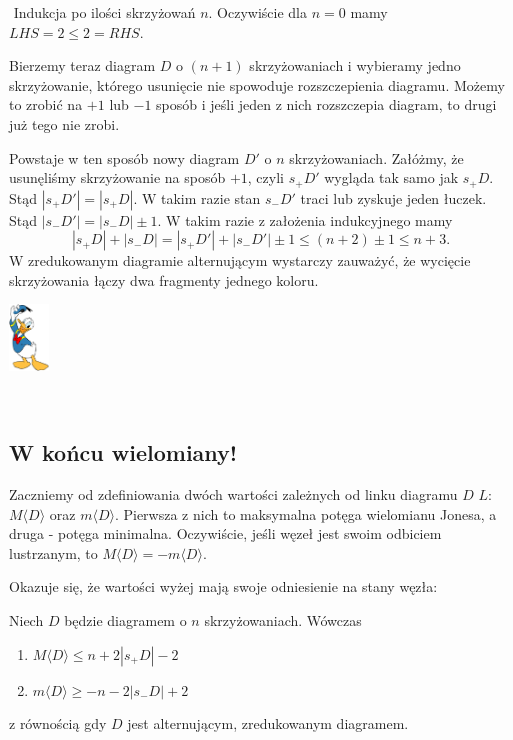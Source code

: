 \documentclass{article}
\renewenvironment{proof}{{\bfseries\color{orange} Dowód}$ $\newline}{
  \begin{flushright}\includegraphics[width=30pt]{Donald_Duck.png}\end{flushright}$ $\newline
}
\begin{document}
\begin{proof}
  Indukcja po ilości skrzyżowań $n$. Oczywiście dla $n=0$ mamy $LHS=2\leq 2=RHS$.

  Bierzemy teraz diagram $D$ o $(n+1)$ skrzyżowaniach i wybieramy jedno skrzyżowanie, którego usunięcie nie spowoduje rozszczepienia diagramu. Możemy to zrobić na $+1$ lub $-1$ sposób i jeśli jeden z nich rozszczepia diagram, to drugi już tego nie zrobi. 

  Powstaje w ten sposób nowy diagram $D'$ o $n$ skrzyżowaniach. Załóżmy, że usunęliśmy skrzyżowanie na sposób $+1$, czyli $s_+D'$ wygląda tak samo jak $s_+D$. Stąd $|s_+D'|=|s_+D|$. W takim razie stan $s_-D'$ traci lub zyskuje jeden łuczek. Stąd $|s_-D'|=|s_-D|\pm 1$. W takim razie z założenia indukcyjnego mamy
  $$|s_+D|+|s_-D|=|s_+D'|+|s_-D'|\pm 1\leq (n+2)\pm 1\leq n+3.$$
  W zredukowanym diagramie alternującym wystarczy zauważyć, że wycięcie skrzyżowania łączy dwa fragmenty jednego koloru.
\end{proof}

\subsection{W końcu wielomiany!}

Zaczniemy od zdefiniowania dwóch wartości zależnych od linku diagramu $D$ $L$: $M\langle D\rangle$ oraz $m\langle D\rangle$. Pierwsza z nich to maksymalna potęga wielomianu Jonesa, a druga - potęga minimalna. Oczywiście, jeśli węzeł jest swoim odbiciem lustrzanym, to $M\langle D\rangle = -m\langle D\rangle$.

Okazuje się, że wartości wyżej mają swoje odniesienie na stany węzła:
\begin{fuck}
  Niech $D$ będzie diagramem o $n$ skrzyżowaniach. Wówczas
  \begin{enumerate}
    \item $M\langle D\rangle \leq n+2|s_+D|-2$
    \item $m\langle D\rangle \geq -n-2|s_-D|+2$
  \end{enumerate}
  z równością gdy $D$ jest alternującym, zredukowanym diagramem.
\end{fuck}
\end{document}

